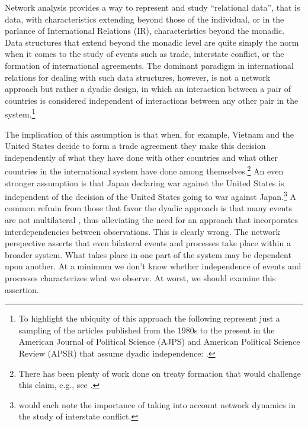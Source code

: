 Network analysis provides a way to represent and study ``relational data'', that is data, with characteristics extending beyond those of the individual, or in the parlance of International Relations (IR), characteristics beyond the monadic. Data structures that extend beyond the monadic level are quite simply the norm when it comes to the study of events such as trade, interstate conflict, or the formation of international agreements. The dominant paradigm in  international relations for dealing with such data structures, however, is not a network approach but rather a dyadic design, in which an interaction between a pair of countries is considered independent of interactions between any other pair in the system.\footnote{To highlight the ubiquity of this approach the following represent just a sampling of the articles published from the 1980s to the present in the American Journal of Political Science (AJPS) and American Political Science Review (APSR) that assume dyadic independence: \citet{dixon:1983,mansfield:etal:2000,lemke:reed:2001a,mitchell:2002,dafoe:2011a,fuhrmann:sechser:2014,carnegie:2014}.} 

The implication of this assumption is that when, for example, Vietnam and the United States decide to form a trade agreement they make this decision independently of what they have done with other countries and what other countries in the international system have done among themselves.\footnote{There has been plenty of work done on treaty formation that would challenge this claim, e.g., see \citet{manger:etal:2012,kinne:2013}.} An even stronger assumption is that Japan declaring war against the United States is independent of the decision of the United States going to war against Japan.\footnote{\citet{maoz:etal:2006,ward:etal:2007,minhas:etal:2016} would each note the importance of taking into account network dynamics in the study of interstate conflict.} A common refrain from those that favor the dyadic approach is that many events are not multilateral \citep{diehl:wright:2016}, thus alleviating the need for an approach that incorporates interdependencies between observations. This is clearly wrong. The network perspective asserts that even bilateral events and processes take place within a broader system. What takes place in one part of the system may be dependent upon another. At a minimum we don't know whether independence of events and processes characterizes what we observe. At worst, we should examine this assertion.  

